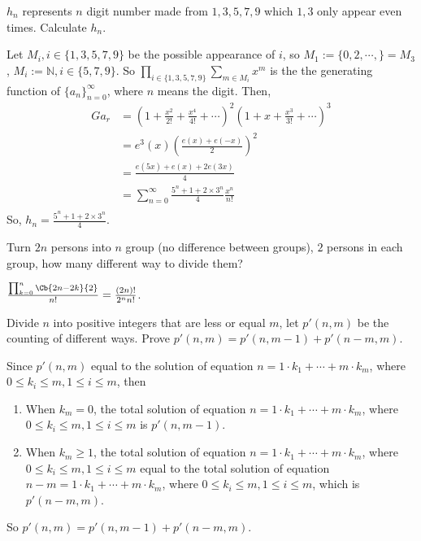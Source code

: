 \documentclass{ctexart}
\begin{document}
\begin{problem}
    $h_n$ represents $n$ digit number made from $1,3,5,7,9$ which $1,3$ only appear even times. Calculate $h_n$.
\end{problem}
\begin{solution}
    Let $M_i, i\in \{1,3,5,7,9\}$ be the possible appearance of $i$, so $M_1:=\{0,2,\cdots,\}=M_3$, $M_i:=\mathbb{N}, i\in\{5,7,9\} $. So $\prod_{i\in\{1,3,5,7,9\}}\sum_{m\in M_i}x^m$ is the the generating function of $\{a_n\}_{n=0}^{\infty}$, where $n$ means the digit. Then,
    \begin{equation}
        \begin{aligned}
            G{a_r}&=(1+\frac{x^2}{2!}+\frac{x^4}{4!}+\cdots)^2(1+x+\frac{x^3}{3!}+\cdots)^3\\
            &=e^3(x)(\frac{e(x)+e(-x)}{2})^2\\
            &=\frac{e(5x)+e(x)+2e(3x)}{4}\\
            &=\sum_{n=0}^{\infty}\frac{5^n+1+2\times 3^n}{4}\frac{x^n}{n!}\\
        \end{aligned}
    \end{equation}
    So, $h_n=\frac{5^n+1+2\times 3^n}{4}$.
\end{solution}



\begin{problem}
    Turn $2n$ persons into $n$ group (no difference between groups), $2$ persons in each group, how many different way to divide them?
\end{problem}
\begin{solution}
    $\frac{\prod_{k=0}^{n}\Cb{2n-2k}{2}}{n!}=\frac{(2n)!}{2^nn!}$.
\end{solution}
\fi

\begin{problem}\label{pro:1}
    Divide $n$ into positive integers that are less or equal $m$, let $p'(n,m)$ be the counting of different ways. Prove $p'(n,m)=p'(n,m-1)+p'(n-m,m)$.
\end{problem}
\begin{solution}
    Since $p'(n,m)$ equal to the solution of equation $n=1\cdot k_1+\cdots+m\cdot k_m$, where $0\leq k_i\leq m, 1\leq i\leq m$, then 
    \begin{enumerate}
        \item When $k_m=0$, the total solution of equation $n=1\cdot k_1+\cdots+m\cdot k_m$, where $0\leq k_i\leq m, 1\leq i\leq m$ is $p'(n,m-1)$.
        \item When $k_m\geq 1$, the total solution of equation $n=1\cdot k_1+\cdots+m\cdot k_m$, where $0\leq k_i\leq m, 1\leq i\leq m$ equal to the total solution of equation $n-m=1\cdot k_1+\cdots+m\cdot k_m$, where $0\leq k_i\leq m, 1\leq i\leq m$, which is $p'(n-m,m)$.
    \end{enumerate}
    So $p'(n,m)=p'(n,m-1)+p'(n-m,m)$.
\end{solution}
\end{document}
